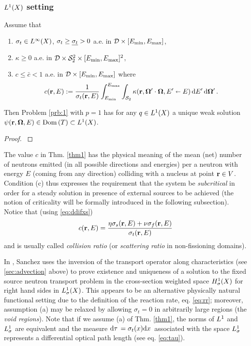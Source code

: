 \subsubsection{$\Lp[1](X)$ setting}
\begin{theorem}\label{thm1}
Assume that
\begin{enumerate}[label=(\alph*)]
	\item $\sigma_t \in \Lp[\infty](X)$, $\sigma_t \geq \mst > 0$ a.e. in $\VV\times[\Emin,\Emax]$,
	\item $\kappa \geq 0$ a.e. in $\VV\times\Sphere^2\times[\Emin,\Emax]^2$,
	\item $\displaystyle c \leq \bar c < 1$ a.e. in $\VV\times[\Emin,\Emax]$ where
	  \begin{equation}\label{eq:c}
	    c(\br,E) := \frac{1}{\sigma_t(\br,E)}\int_{\Emin}^{\Emax}\int_{\Sphere} \kappa(\br,\bomega'\cdot\bomega,
	    E'\sla E)\,\d{E'}\d{\bomega'}.
	  \end{equation}
\end{enumerate}
Then Problem \ref{prb:1} with $p = 1$ has for any $q\in \Lp[1](X)$ a unique weak solution 
$\psi(\br,\bomega,E)\in\Dom{T}\subset\Lp[1](X)$.
\end{theorem}
\begin{proof}
\cite[Chap. XXI, \S 2, Proposition 5]{DautrayLions}
\end{proof}

The value $c$ in Thm. \ref{thm1} has the physical meaning of the mean (net) number of neutrons emitted (in all possible
directions and energies) per a neutron with energy $E$ (coming from any direction) colliding with a nucleus at point
$\br\in V$. 
Condition (c) thus expresses the requirement that the system be \textit{subcritical} in order for a
steady solution in presence of external sources to be achieved (the notion of criticality will be formally introduced in the following
subsection).
Notice that (using \eqref{eq:ddifxs})
\begin{equation}\label{eq:scattering_ratio}
	c(\br,E) = \frac{\eta\sigma_s(\br,E) + \nu\sigma_f(\br,E)}{\sigma_t(\br,E)}
\end{equation}
and is usually called \textit{collision ratio}  (or
\textit{scattering ratio} in non-fissioning domains).

 In \cite{Sanchez3}, Sanchez uses the inversion of the transport operator along characteristics (see \ref{sec:advection}
 above) to prove existence and uniqueness of a solution to the fixed source neutron transport problem in
 the cross-section weighted space $\Hp[1]_{\sigma}(X)$ for right hand sides in $\Lp[1]_{\sigma}(X)$.
 This appears to be an alternative physically natural functional setting due to the definition of the reaction rate, eq. 
 \eqref{eq:rr}; moreover, assumption (a) may be relaxed by allowing $\sigma_t = 0$ in arbitrarily large regions 
  (the \textit{void regions}). Note that if we assume (a) of Thm. \ref{thm1}, the norms of $\Lp[1]$ and
  $\Lp[1]_{\sigma}$ are equivalent and the measure $\d{\tau} = \sigma_t(x) \d{x}$ associated with the space
  $\Lp[1]_{\sigma}$ represents a differential optical path length (see eq. \eqref{eq:tau}).

